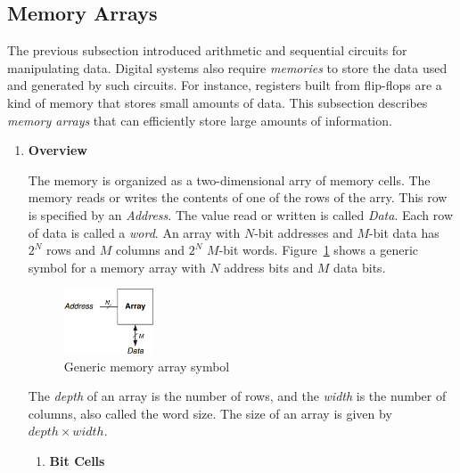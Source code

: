 \documentclass[12pt]{article}
\numberwithin{figure}{subsection}
\numberwithin{table}{subsection}
\numberwithin{equation}{subsection}
\begin{document}
\subsection{Memory Arrays}

The previous subsection introduced arithmetic and sequential circuits for manipulating data. Digital systems also require \textit{memories} to store the data used and generated by such circuits. For instance, registers built from flip-flops are a kind of memory that stores small amounts of data. This subsection describes \textit{memory arrays} that can efficiently store large amounts of information.

\begin{enumerate}
  \item \textbf{Overview}

  The memory is organized as a two-dimensional arry of memory cells. The memory reads or writes the contents of one of the rows of the arry. This row is specified by an \textit{Address}. The value read or written is called \textit{Data}. Each row of data is called a \textit{word}. An array with $N$-bit addresses and $M$-bit data has $2^N$ rows and $M$ columns and $2^N$ $M$-bit words. Figure~\ref{fig:generic_memory_array_symbol} shows a generic symbol for a memory array with $N$ address bits and $M$ data bits.

  \begin{figure}[ht]
    \centering
    \includegraphics[width=0.25\textwidth]{generic_memory_array_symbol.png}
    \caption{Generic memory array symbol}
    \label{fig:generic_memory_array_symbol}
  \end{figure}

  The \textit{depth} of an array is the number of rows, and the \textit{width} is the number of columns, also called the word size. The size of an array is given by $depth \times width$.

  \begin{enumerate}
    \item \textbf{Bit Cells}


\end{enumerate}
\end{enumerate}
\end{document}
